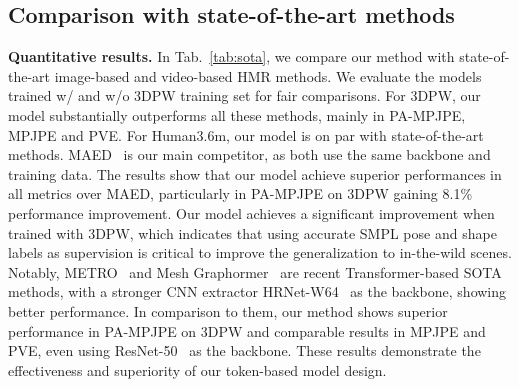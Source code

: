 
\subsection{Comparison with state-of-the-art methods}


                                     

{\bf Quantitative results.} In Tab.~\ref{tab:sota}, we compare our method with state-of-the-art image-based and video-based HMR methods. We evaluate the models trained w/ and w/o 3DPW training set for fair comparisons.  For 3DPW, our model substantially outperforms all these methods, mainly in PA-MPJPE, MPJPE and PVE. For Human3.6m, our model is on par with state-of-the-art methods. 
MAED~\citep{maed:wan2021encoder} is our main competitor, as both use the same backbone and training data. The results show that our model achieve superior performances in all metrics over MAED, particularly in PA-MPJPE on 3DPW gaining 8.1\% performance improvement. 
Our model achieves a significant improvement when trained with 3DPW, which indicates that using accurate SMPL pose and shape labels as supervision is critical to improve the generalization to in-the-wild scenes. 
Notably, METRO~\citep{metro:lin2021end} and Mesh Graphormer~\citep{meshgrahormer:lin2021mesh} are recent Transformer-based SOTA methods, with a stronger CNN extractor HRNet-W64~\citep{hrnet:sun2019deep} as the backbone, showing better performance. %
In comparison to them, our method shows superior performance in PA-MPJPE on 3DPW and comparable results in MPJPE and PVE, even using ResNet-50~\citep{resnet:he2016deep} as the backbone. These results demonstrate the effectiveness and superiority of our token-based model design.

